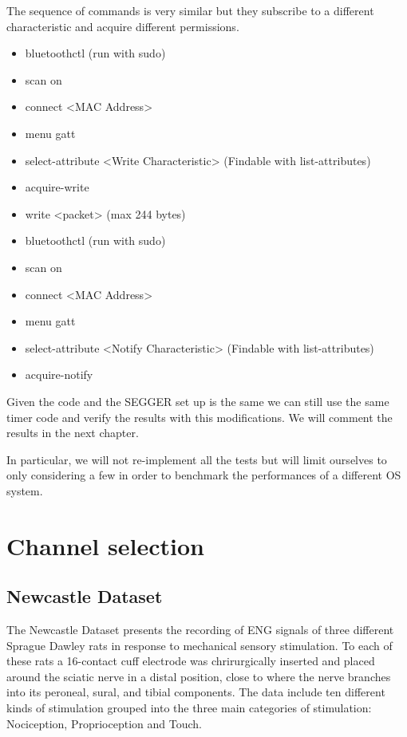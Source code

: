 \documentclass{Configuration_Files/PoliMi3i_thesis}
\begin{document}
The sequence of commands is very similar but they subscribe to a different characteristic and acquire different permissions.

\begin{itemize}
	\item bluetoothctl (run with sudo)\
	\item scan on
	\item connect <MAC Address>
	\item menu gatt
	\item select-attribute <Write Characteristic> (Findable with list-attributes)
	\item acquire-write
	\item write <packet> (max 244 bytes)
\end{itemize}

\begin{itemize}
	\item bluetoothctl (run with sudo)\
	\item scan on
	\item connect <MAC Address>
	\item menu gatt
	\item select-attribute <Notify Characteristic> (Findable with list-attributes)
	\item acquire-notify
\end{itemize}

Given the code and the SEGGER set up is the same we can still use the same timer code and verify the results with this modifications.
We will comment the results in the next chapter.

In particular, we will not re-implement all the tests but will limit ourselves to only considering a few in order to benchmark the performances of a different OS system.



\section{Channel selection}

\subsection{Newcastle Dataset}

The Newcastle Dataset presents the recording of ENG signals of three different Sprague Dawley rats in response to mechanical sensory stimulation.
To each of these rats a 16-contact cuff electrode was chrirurgically inserted and placed around the sciatic nerve in a distal position, close to where the nerve branches into its peroneal, sural, and tibial components.
The data include ten different kinds of stimulation grouped into the three main categories of stimulation: Nociception, Proprioception and Touch.
\end{document}
